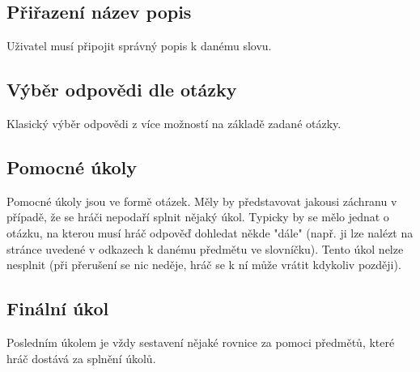 \documentclass[a4paper,12pt]{article}
\begin{document}
\subsection{Přiřazení název popis}
Uživatel musí připojit správný popis k danému slovu.
\begin{figure}[H]
\end{figure}
\subsection{Výběr odpovědi dle otázky}
Klasický výběr odpovědi z více možností na základě zadané otázky.
\begin{figure}[H]
\end{figure}
\subsection{Pomocné úkoly}
Pomocné úkoly jsou ve formě otázek. Měly by představovat jakousi záchranu v případě, že se hráči nepodaří splnit nějaký úkol. Typicky by se mělo  jednat o otázku, na kterou musí hráč odpověď dohledat někde "dále" (např. ji lze nalézt na stránce uvedené v odkazech k danému předmětu ve slovníčku). Tento úkol nelze nesplnit (při přerušení se nic neděje, hráč se k ní může vrátit kdykoliv později).\subsection{Finální úkol}
Posledním úkolem je vždy sestavení nějaké rovnice za pomoci předmětů, které hráč dostává za splnění úkolů.
\newpage
\end{document}
